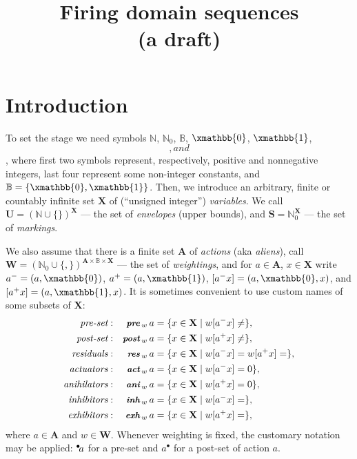 \documentclass [a4paper,12pt] {article}
\theoremstyle{definition}
\newcommand{\xbot}{}
\DeclareRobustCommand{\xbot}{\mathop{\textstyle\mathsmaller{\bm\bot}}}
\newcommand{\xtop}{}
\DeclareRobustCommand{\xtop}{\mathop{\textstyle\mathsmaller{\bm\top}}}
\newcommand{\preset}[1]{\prescript{\bullet}{}{\!#1}}
\newcommand{\postset}[1]{#1^{\bullet}}
\newcommand{\varset}[2]{\mathop {\textbf {\small\em #1}\,_{#2}}}
\begin{document}
\title {Firing domain sequences\\(a draft)}
\author {}
\date {}
\maketitle

\section {Introduction}

To set the stage we need symbols $\mathbb {N}$, $\mathbb {N}_0$,
$\mathbb {B}$, $\xmathbb {0}$, $\xmathbb {1}$, $\xbot$, and $\xtop$,
where first two symbols represent, respectively, positive and
nonnegative integers, last four represent some non-integer constants,
and $\mathbb {B} = \{ \xmathbb {0}, \xmathbb {1} \}$.  Then, we
introduce an arbitrary, finite or countably infinite set $\mathbf {X}$
of (``unsigned integer'') {\em variables}\/.  We call $\mathbf {U} =
(\mathbb {N}\cup\{\xtop\})^\mathbf {X}$ --- the set of {\em
  envelopes}\/ (upper bounds), and $\mathbf {S} = \mathbb
{N}_0^\mathbf {X}$ --- the set of {\em markings}\/.

We also assume that there is a finite set $\mathbf {A}$ of {\em
  actions}\/ (aka {\em aliens}\/), call $\mathbf {W} = (\mathbb
{N}_0\cup\{\xbot, \xtop\})^{\mathbf {A} \times \mathbb {B} \times
  \mathbf {X}}$ --- the set of {\em weightings}\/, and for $a \in
\mathbf {A}$, $x \in \mathbf {X}$ write $a^- = (a, \xmathbb {0})$,
$a^+ = (a, \xmathbb {1})$, $[a^-x] = (a, \xmathbb {0}, x)$, and
$[a^+x] = (a, \xmathbb {1}, x)$.  It is sometimes convenient to use
custom names of some subsets of $\mathbf {X}$:
%
\begin {align*}
\qquad\qquad\qquad\textit {pre-set}\/:&&\varset {pre}{w}a =&\; \{ x \in \mathbf {X} \;|\; w[a^-x] \neq \xbot \},\qquad\qquad\qquad\\
\qquad\qquad\qquad\textit {post-set}\/:&&\varset {post}{w}a =&\; \{ x \in \mathbf {X} \;|\; w[a^+x] \neq \xbot \},\qquad\qquad\qquad\\
\qquad\qquad\qquad\textit {residuals}\/:&& \varset {res}{w}a =&\; \{ x \in \mathbf {X} \;|\; w[a^-x] = w[a^+x] = \xbot \},\qquad\qquad\qquad\\
\qquad\qquad\qquad\textit {actuators}\/:&& \varset {act}{w}a =&\; \{ x \in \mathbf {X} \;|\; w[a^-x] = 0 \},\qquad\qquad\qquad\\
\qquad\qquad\qquad\textit {anihilators}\/:&& \varset {ani}{w}a =&\; \{ x \in \mathbf {X} \;|\; w[a^+x] = 0 \},\qquad\qquad\qquad\\
\qquad\qquad\qquad\textit {inhibitors}\/:&& \varset {inh}{w}a =&\; \{ x \in \mathbf {X} \;|\; w[a^-x] = \xtop \},\qquad\qquad\qquad\\
\qquad\qquad\qquad\textit {exhibitors}\/:&& \varset {exh}{w}a =&\; \{ x \in \mathbf {X} \;|\; w[a^+x] = \xtop \},\qquad\qquad\qquad
\end {align*}
%
where $a \in \mathbf {A}$ and $w \in \mathbf {W}$.  Whenever weighting
is fixed, the customary notation may be applied: $\preset{a}$ for a
pre-set and $\postset{a}$ for a post-set of action $a$.
\end{document}

